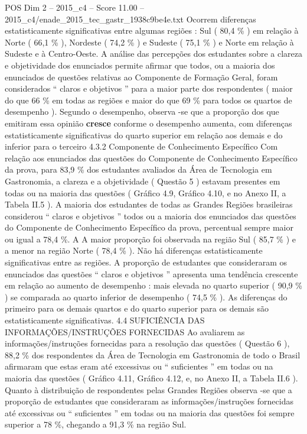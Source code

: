 \begin{textsample}{POS Dim 2 – 2015\_c4 – Score 11.00 – 2015\_c4/enade\_2015\_tec\_gastr\_1938c9be4e.txt}
Ocorrem diferenças estatisticamente significativas entre algumas regiões : Sul ( 80,4 \% ) em relação à Norte ( 66,1 \% ), Nordeste ( 74,2 \% ) e Sudeste ( 75,1 \% ) e Norte em relação à Sudeste e à Centro-Oeste.
A análise das percepções dos estudantes sobre a clareza e objetividade dos enunciados permite afirmar que todos, ou a maioria dos enunciados de questões relativas ao Componente de Formação Geral, foram considerados “ claros e objetivos ” para a maior parte dos respondentes ( maior do que 66 \% em todas as regiões e maior do que 69 \% para todos os quartos de desempenho ).
Segundo o desempenho, observa -se que a proporção dos que emitiram essa opinião \textbf{cresce} conforme o desempenho aumenta, com diferenças estatisticamente significativas do quarto superior em relação aos demais e do inferior para o terceiro 4.3.2 Componente de Conhecimento Específico Com relação aos enunciados das questões do Componente de Conhecimento Específico da prova, para 83,9 \% dos estudantes avaliados da Área de Tecnologia em Gastronomia, a clareza e a objetividade ( Questão 5 ) estavam presentes em todas ou na maioria das questões ( Gráfico 4.9, Gráfico 4.10, e no Anexo II, a Tabela II.5 ).
A maioria dos estudantes de todas as Grandes Regiões brasileiras considerou “ claros e objetivos ” todos ou a maioria dos enunciados das questões do Componente de Conhecimento Específico da prova, percentual sempre maior ou igual a 78,4 \%.
A A maior proporção foi observada na região Sul ( 85,7 \% ) e a menor na região Norte ( 78,4 \% ).
Não há diferenças estatisticamente significativas entre as regiões.
A proporção de estudantes que consideraram os enunciados das questões “ claros e objetivos ” apresenta uma tendência crescente em relação ao aumento de desempenho : mais elevada no quarto superior ( 90,9 \% ) se comparada ao quarto inferior de desempenho ( 74,5 \% ).
As diferenças do primeiro para os demais quartos e do quarto superior para os demais são estatisticamente significativas. 4.4 SUFICIÊNCIA DAS INFORMAÇÕES/INSTRUÇÕES FORNECIDAS Ao avaliarem as informações/instruções fornecidas para a resolução das questões ( Questão 6 ), 88,2 \% dos respondentes da Área de Tecnologia em Gastronomia de todo o Brasil afirmaram que estas eram até excessivas ou “ suficientes ” em todas ou na maioria das questões ( Gráfico 4.11, Gráfico 4.12, e, no Anexo II, a Tabela II.6 ).
Quanto à distribuição de respondentes pelas Grandes Regiões observa -se que a proporção de estudantes que consideraram as informações/instruções fornecidas até excessivas ou “ suficientes ” em todas ou na maioria das questões foi sempre superior a 78 \%, chegando a 91,3 \% na região Sul.

\end{textsample}
